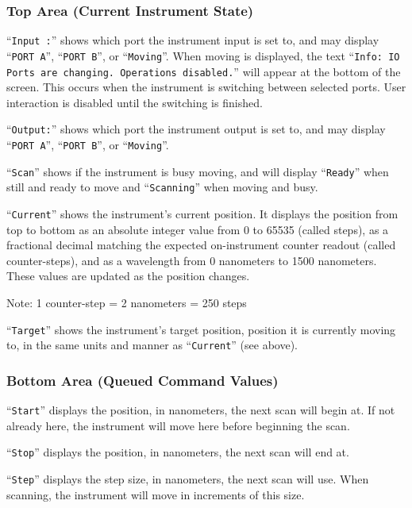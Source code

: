 \documentclass{article}
\begin{document}
\subsubsection{Top Area (Current Instrument State)} \label{subsubsection:statustoparea}

``\verb|Input :|'' shows which port the instrument input is set to, and may display ``\verb|PORT A|'', ``\verb|PORT B|'', or ``\verb|Moving|''. When moving is displayed, the text ``\verb|Info: IO Ports are changing. Operations disabled.|'' will appear at the bottom of the screen. This occurs when the instrument is switching between selected ports. User interaction is disabled until the switching is finished.

``\verb|Output:|'' shows which port the instrument output is set to, and may display ``\verb|PORT A|'', ``\verb|PORT B|'', or ``\verb|Moving|''.

``\verb|Scan|'' shows if the instrument is busy moving, and will display ``\verb|Ready|'' when still and ready to move and ``\verb|Scanning|'' when moving and busy.

``\verb|Current|'' shows the instrument's current position. It displays the position from top to bottom as an absolute integer value from 0 to 65535 (called steps), as a fractional decimal matching the expected on-instrument counter readout (called counter-steps), and as a wavelength from 0 nanometers to 1500 nanometers. These values are updated as the position changes.

Note: 1 counter-step = 2 nanometers = 250 steps

``\verb|Target|'' shows the instrument's target position, position it is currently moving to, in the same units and manner as ``\verb|Current|'' (see above).

\subsubsection{Bottom Area (Queued Command Values)} \label{subsubsection:statusbottomarea}

``\verb|Start|'' displays the position, in nanometers, the next scan will begin at. If not already here, the instrument will move here before beginning the scan.

``\verb|Stop|'' displays the position, in nanometers, the next scan will end at.

``\verb|Step|'' displays the step size, in nanometers, the next scan will use. When scanning, the instrument will move in increments of this size.
\end{document}
